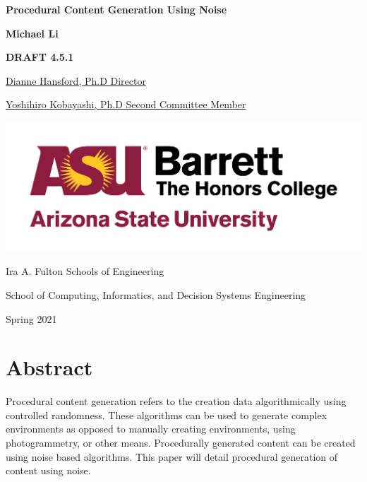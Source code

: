 \documentclass[10pt]{report}
\begin{document}
	\begin{titlepage}
		\begin{center}
			\Large
			\textbf{Procedural Content Generation Using Noise}
			
			\vspace{1.5cm}
			\normalsize
			\textbf{Michael Li}
			
			\vfill
			
			\textbf{DRAFT 4.5.1}
			
			\uline{Dianne Hansford, Ph.D \hfill Director}
			\vspace{1cm}
			
			\uline{Yoshihiro Kobayashi, Ph.D \hfill Second Committee Member}
			
			\vspace{3cm}
			
			\includegraphics[scale=.5]{asu_barretthonors_horiz_rgb_maroongold_600ppi}
			
			\vspace{1.5cm}
			Ira A. Fulton Schools of Engineering
			
			School of Computing, Informatics, and Decision Systems Engineering
			
			Spring 2021
			
		\end{center}
	\end{titlepage}
	
	\chapter*{Abstract}
	
	Procedural content generation refers to the creation data algorithmically using controlled randomness. These algorithms can be used to generate complex environments as opposed to manually creating environments, using photogrammetry, or other means. Procedurally generated content can be created using noise based algorithms. This paper will detail procedural generation of content using noise.
	
\end{document}
